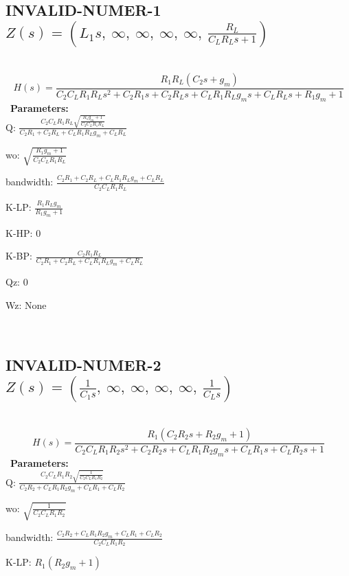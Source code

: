 \documentclass{article}
\begin{document}
\subsection{INVALID-NUMER-1 $Z(s) = \left( L_{1} s, \  \infty, \  \infty, \  \infty, \  \infty, \  \frac{R_{L}}{C_{L} R_{L} s + 1}\right)$ } \ 
\textbf{\[H(s) = \frac{R_{1} R_{L} \left(C_{2} s + g_{m}\right)}{C_{2} C_{L} R_{1} R_{L} s^{2} + C_{2} R_{1} s + C_{2} R_{L} s + C_{L} R_{1} R_{L} g_{m} s + C_{L} R_{L} s + R_{1} g_{m} + 1}\] } \ 
\textbf{Parameters:}\\ 

Q: $\frac{C_{2} C_{L} R_{1} R_{L} \sqrt{\frac{R_{1} g_{m} + 1}{C_{2} C_{L} R_{1} R_{L}}}}{C_{2} R_{1} + C_{2} R_{L} + C_{L} R_{1} R_{L} g_{m} + C_{L} R_{L}}$\ 

wo: $\sqrt{\frac{R_{1} g_{m} + 1}{C_{2} C_{L} R_{1} R_{L}}}$\ 

bandwidth: $\frac{C_{2} R_{1} + C_{2} R_{L} + C_{L} R_{1} R_{L} g_{m} + C_{L} R_{L}}{C_{2} C_{L} R_{1} R_{L}}$\ 

K-LP: $\frac{R_{1} R_{L} g_{m}}{R_{1} g_{m} + 1}$\ 

K-HP: $0$\ 

K-BP: $\frac{C_{2} R_{1} R_{L}}{C_{2} R_{1} + C_{2} R_{L} + C_{L} R_{1} R_{L} g_{m} + C_{L} R_{L}}$\ 

Qz: $0$\ 

Wz: $\text{None}$\ 

\ 

\subsection{INVALID-NUMER-2 $Z(s) = \left( \frac{1}{C_{1} s}, \  \infty, \  \infty, \  \infty, \  \infty, \  \frac{1}{C_{L} s}\right)$ } \ 
\textbf{\[H(s) = \frac{R_{1} \left(C_{2} R_{2} s + R_{2} g_{m} + 1\right)}{C_{2} C_{L} R_{1} R_{2} s^{2} + C_{2} R_{2} s + C_{L} R_{1} R_{2} g_{m} s + C_{L} R_{1} s + C_{L} R_{2} s + 1}\] } \ 
\textbf{Parameters:}\\ 

Q: $\frac{C_{2} C_{L} R_{1} R_{2} \sqrt{\frac{1}{C_{2} C_{L} R_{1} R_{2}}}}{C_{2} R_{2} + C_{L} R_{1} R_{2} g_{m} + C_{L} R_{1} + C_{L} R_{2}}$\ 

wo: $\sqrt{\frac{1}{C_{2} C_{L} R_{1} R_{2}}}$\ 

bandwidth: $\frac{C_{2} R_{2} + C_{L} R_{1} R_{2} g_{m} + C_{L} R_{1} + C_{L} R_{2}}{C_{2} C_{L} R_{1} R_{2}}$\ 

K-LP: $R_{1} \left(R_{2} g_{m} + 1\right)$\ 
\end{document}
